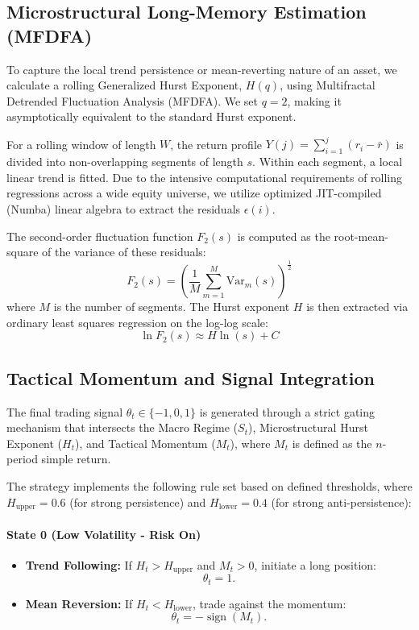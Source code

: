 \documentclass[12pt]{article}
\begin{document}
\subsection{Microstructural Long-Memory Estimation (MFDFA)}

To capture the local trend persistence or mean-reverting nature of an asset, we calculate a rolling Generalized Hurst Exponent, $H(q)$, using Multifractal Detrended Fluctuation Analysis (MFDFA). We set $q=2$, making it asymptotically equivalent to the standard Hurst exponent.

For a rolling window of length $W$, the return profile $Y(j) = \sum_{i=1}^j (r_i - \bar{r})$ is divided into non-overlapping segments of length $s$. Within each segment, a local linear trend is fitted. Due to the intensive computational requirements of rolling regressions across a wide equity universe, we utilize optimized JIT-compiled (Numba) linear algebra to extract the residuals $\epsilon(i)$.

The second-order fluctuation function $F_2(s)$ is computed as the root-mean-square of the variance of these residuals: $$ F_2(s) = \left( \frac{1}{M} \sum_{m=1}^{M} \text{Var}_m(s) \right)^{\frac{1}{2}} $$ where $M$ is the number of segments. The Hurst exponent $H$ is then extracted via ordinary least squares regression on the log-log scale: $$ \ln F_2(s) \approx H \ln(s) + C $$

\subsection{Tactical Momentum and Signal Integration}
The final trading signal $\theta_t \in \{-1, 0, 1\}$ is generated through a strict gating mechanism that intersects the Macro Regime ($S_t$), Microstructural Hurst Exponent ($H_t$), and Tactical Momentum ($M_t$), where $M_t$ is defined as the $n$-period simple return.

The strategy implements the following rule set based on defined thresholds, where $H_{\text{upper}} = 0.6$ (for strong persistence) and $H_{\text{lower}} = 0.4$ (for strong anti-persistence):

\paragraph{State 0 (Low Volatility - Risk On)}
\begin{itemize}
    \item \textbf{Trend Following:} If $H_t > H_{\text{upper}}$ and $M_t > 0$, initiate a long position:
    \[
    \theta_t = 1.
    \]
    \item \textbf{Mean Reversion:} If $H_t < H_{\text{lower}}$, trade against the momentum:
    \[
    \theta_t = -\operatorname{sign}(M_t).
    \]
\end{itemize}
\end{document}
